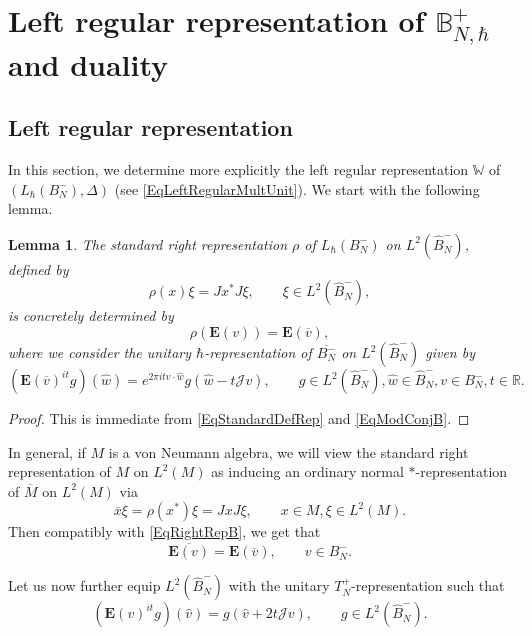 \documentclass[11pt, reqno]{amsart}
\newtheorem{lemma}[theorem]{Lemma}
\theoremstyle{definition}
\numberwithin{equation}{section}
\def\R{\mathbb R}
\newcommand{\eb}{\mathbf{E}}
\newcommand{\Bor}{B}
\newcommand{\Tor}{T}
\newcommand{\Eb}{\mathbf{E}}
\newcommand{\Wbb}{\mathbb{W}}
\newcommand{\Bbbb}{\mathbb{B}}
\newcommand{\Jc}{\mathcal{J}}
\begin{document}
\section{Left regular representation of  \texorpdfstring{$\Bbbb_{N,\hbar}^+$}{the upper Borel quantum group} and duality}

\subsection{Left regular representation}


In this section, we determine more explicitly the left regular representation $\Wbb$ of $(L_{\hbar}(\Bor_N^-),\Delta)$ (see \eqref{EqLeftRegularMultUnit}). We start with the following lemma.

\begin{lemma}
The standard right representation $\rho$ of $L_{\hbar}(\Bor_N^-)$ on $L^2(\hat{\Bor}_N^-)$, defined by 
\[
\rho(x)\xi = J x^*J\xi,\qquad \xi \in L^2(\hat{\Bor}_N^-), 
\]
is concretely determined by 
\begin{equation}\label{EqRightRepB}
\rho(\Eb(v)) = \Eb(\overline{v}),
\end{equation}
where we consider the unitary $\hbar$-representation of $\overline{\Bor_N^-}$ on $L^2(\hat{\Bor}_N^-)$ given by 
\begin{equation}\label{EqRightAction}
(\Eb(\overline{v})^{it}g)(\hat{w}) = e^{2\pi i tv\cdot \hat{w}}g(\hat{w}-t\Jc v),\qquad g \in L^2(\hat{\Bor}_N^-),\hat{w}\in \hat{\Bor}_N^-,v\in \Bor_N^-, t\in \R.
\end{equation}
\end{lemma} 
\begin{proof}
This is immediate from \eqref{EqStandardDefRep} and \eqref{EqModConjB}.
\end{proof}
In general, if $M$ is a von Neumann algebra, we will view the standard right representation of $M$ on $L^2(M)$ as inducing an ordinary normal $*$-representation of $\overline{M}$ on $L^2(M)$ via 
\[
\overline{x}\xi = \rho(x^*)\xi = J xJ\xi,\qquad x\in M,\xi\in L^2(M). 
\]
Then compatibly with \eqref{EqRightRepB}, we get that
\[
\overline{\eb(v)} = \eb(\overline{v}),\qquad v\in \Bor_N^-. 
\]


Let us now further equip $L^2(\hat{\Bor}_N^-)$ with the unitary $\Tor_N^+$-representation such that 
\begin{equation}\label{EqActionDualHPlus}
(\Eb(v)^{it}g)(\hat{v}) = g(\hat{v}+2t \Jc v),\qquad g\in L^2(\hat{\Bor}_N^-). 
\end{equation}
\end{document}
